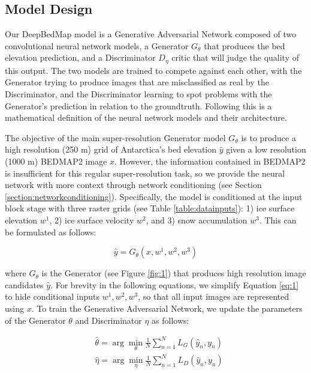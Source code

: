 \documentclass[tc, manuscript]{copernicus}
\begin{document}
\subsection{Model Design} \label{section:modeldesign}

Our DeepBedMap model is a Generative Adversarial Network \citep{GoodfellowGenerativeAdversarialNetworks2014} composed of two convolutional neural network models, a Generator $G_\theta$ that produces the bed elevation prediction, and a Discriminator $D_\eta$ critic that will judge the quality of this output.
The two models are trained to compete against each other, with the Generator trying to produce images that are misclassified as real by the Discriminator, and the Discriminator learning to spot problems with the Generator's prediction in relation to the groundtruth.
Following this is a mathematical definition of the neural network models and their architecture.

The objective of the main super-resolution Generator model $G_\theta$ is to produce a high resolution (250 m) grid of Antarctica's bed elevation $\hat{y}$ given a low resolution (1000 m) BEDMAP2 \citep{FretwellBedmap2improvedice2013} image $x$.
However, the information contained in BEDMAP2 is insufficient for this regular super-resolution task, so we provide the neural network with more context through network conditioning (see Section \ref{section:networkconditioning}).
Specifically, the model is conditioned at the input block stage with three raster grids (see Table \ref{table:datainputs}): 1) ice surface elevation $w^1$, 2) ice surface velocity $w^2$, and 3) snow accumulation $w^3$.
This can be formulated as follows:

\begin{equation}\label{eq:1}
  \hat{y} = G_\theta(x, w^1, w^2, w^3)
\end{equation}

where $G_\theta$ is the Generator (see Figure \ref{fig:1}) that produces high resolution image candidates $\hat{y}$.
For brevity in the following equations, we simplify Equation \eqref{eq:1} to hide conditional inputs $w^1, w^2, w^3$, so that all input images are represented using $x$.
To train the Generative Adversarial Network, we update the parameters of the Generator $\theta$ and Discriminator $\eta$ as follows:

\begin{align}
  & \hat{\theta} = \arg\min_{\theta} \frac{1}{N}\sum_{n=1}^{N}L_G(\hat{y}_n, y_n) \label{eq:2}\\
  & \hat{\eta} = \arg\min_{\eta} \frac{1}{N}\sum_{n=1}^{N}L_D(\hat{y}_n, y_n) \label{eq:3}
\end{align}
\end{document}
